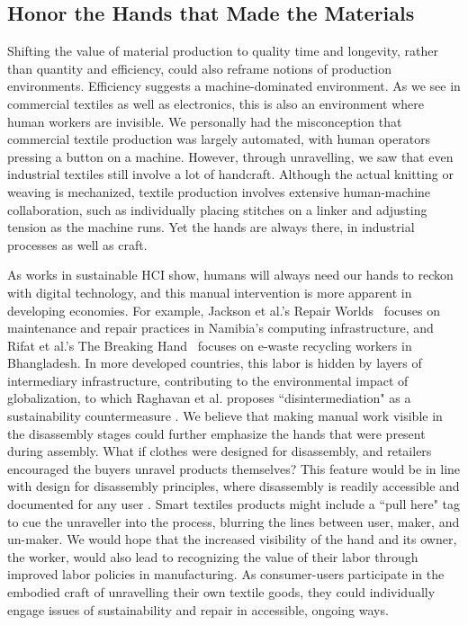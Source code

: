 \subsection{Honor the Hands that Made the Materials}

Shifting the value of material production to quality time and longevity, rather than quantity and efficiency, could also reframe notions of production environments. Efficiency suggests a machine-dominated environment. As we see in commercial textiles as well as electronics, this is also an environment where human workers are invisible. We personally had the misconception that commercial textile production was largely automated, with human operators pressing a button on a machine. However, through unravelling, we saw that even industrial textiles still involve a lot of handcraft. Although the actual knitting or weaving is mechanized, textile production involves extensive human-machine collaboration, such as individually placing stitches on a linker and adjusting tension as the machine runs. \cite{engineers_complete_2017} Yet the hands are always there, in industrial processes as well as craft. 

As works in sustainable HCI show, humans will always need our hands to reckon with digital technology, and this manual intervention is more apparent in developing economies. For example, Jackson et al.'s Repair Worlds~\cite{jackson_repair_2012} focuses on maintenance and repair practices in Namibia's computing infrastructure, and Rifat et al.'s The Breaking Hand~\cite{rifat_breaking_2019} focuses on e-waste recycling workers in Bhangladesh. In more developed countries, this labor is hidden by layers of intermediary infrastructure, contributing to the environmental impact of globalization, to which Raghavan et al. proposes ``disintermediation" as a sustainability countermeasure \cite{raghavan_means_2017}. We believe that making manual work visible in the disassembly stages could further emphasize the hands that were present during assembly. What if clothes were designed for disassembly, and retailers encouraged the buyers unravel products themselves? This feature would be in line with design for disassembly principles, where disassembly is readily accessible and documented for any user \cite{webster_dfd}. Smart textiles products might include a ``pull here" tag to cue the unraveller into the process, blurring the lines between user, maker, and un-maker. We would hope that the increased visibility of the hand and its owner, the worker, would also lead to recognizing the value of their labor through improved labor policies in manufacturing. As consumer-users participate in the embodied craft of unravelling their own textile goods, they could individually engage issues of sustainability and repair in accessible, ongoing ways.

